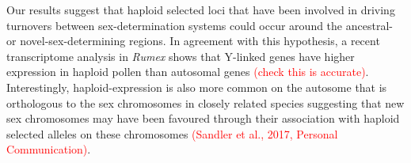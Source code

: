 \documentclass[12pt]{article}
\begin{document}
Our results suggest that haploid selected loci that have been involved in driving turnovers between sex-determination systems could occur around the ancestral- or novel-sex-determining regions. 
In agreement with this hypothesis, a recent transcriptome analysis in \textit{Rumex} shows that Y-linked genes have higher expression in haploid pollen than autosomal genes \textcolor{red}{(check this is accurate)}.
Interestingly, haploid-expression is also more common on the autosome that is orthologous to the sex chromosomes in closely related species suggesting that new sex chromosomes may have been favoured through their association with haploid selected alleles on these chromosomes \textcolor{red}{(Sandler et al., 2017, Personal Communication)}.
\end{document}
